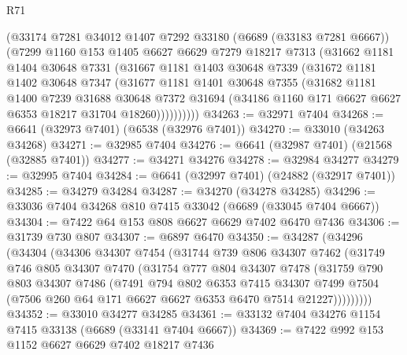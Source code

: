 \begin{lexlean}{R71}
\begin{coremodule}
        (@33174
          @7281
          @34012
          @1407
          @7292
          @33180
          (@6689 (@33183 @7281 @6667))
          (@7299
            @1160
            @153
            @1405
            @6627
            @6629
            @7279
            @18217
            @7313
            (@31662
              @1181
              @1404
              @30648
              @7331
              (@31667
                @1181
                @1403
                @30648
                @7339
                (@31672
                  @1181
                  @1402
                  @30648
                  @7347
                  (@31677
                    @1181
                    @1401
                    @30648
                    @7355
                    (@31682
                      @1181
                      @1400
                      @7239
                      @31688
                      @30648
                      @7372
                      @31694
                      (@34186 @1160 @171 @6627 @6627 @6353 @18217 @31704 @18260))))))))))
@34263 := @32971 @7404
@34268 := @6641 (@32973 @7401) (@6538 (@32976 @7401))
@34270 := @33010 (@34263 @34268)
@34271 := @32985 @7404
@34276 := @6641 (@32987 @7401) (@21568 (@32885 @7401))
@34277 := @34271 @34276
@34278 := @32984 @34277
@34279 := @32995 @7404
@34284 := @6641 (@32997 @7401) (@24882 (@32917 @7401))
@34285 := @34279 @34284
@34287 := @34270 (@34278 @34285)
@34296 := @33036 @7404 @34268 @810 @7415 @33042 (@6689 (@33045 @7404 @6667))
@34304 := @7422 @64 @153 @808 @6627 @6629 @7402 @6470 @7436
@34306 := @31739 @730 @807
@34307 := @6897 @6470
@34350 := @34287
    (@34296
      (@34304
        (@34306
          @34307
          @7454
          (@31744
            @739
            @806
            @34307
            @7462
            (@31749
              @746
              @805
              @34307
              @7470
              (@31754
                @777
                @804
                @34307
                @7478
                (@31759
                  @790
                  @803
                  @34307
                  @7486
                  (@7491
                    @794
                    @802
                    @6353
                    @7415
                    @34307
                    @7499
                    @7504
                    (@7506 @260 @64 @171 @6627 @6627 @6353 @6470 @7514 @21227)))))))))
@34352 := @33010 @34277 @34285
@34361 := @33132 @7404 @34276 @1154 @7415 @33138 (@6689 (@33141 @7404 @6667))
@34369 := @7422 @992 @153 @1152 @6627 @6629 @7402 @18217 @7436

\end{coremodule}
\end{lexlean}
